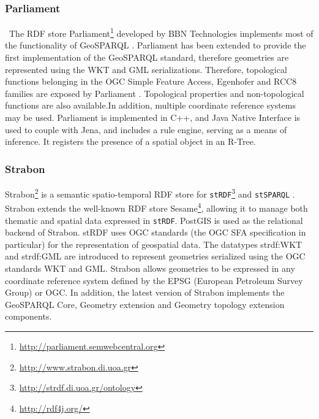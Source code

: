 \subsubsection{Parliament}
\
The RDF store Parliament\footnote{\url{http://parliament.semwebcentral.org}} developed by BBN Technologies implements most of the functionality of GeoSPARQL \cite{battle12}.
Parliament has been extended to provide the first implementation of the GeoSPARQL standard, therefore geometries are represented using the WKT and GML serializations.
Therefore, topological functions belonging in the OGC Simple Feature Access, Egenhofer and RCC8 families are exposed by Parliament \cite{battle12}.
Topological properties and non-topological functions are also available.In addition, multiple coordinate reference systems may be used. Parliament is implemented in C++, and Java Native Interface is used to couple with Jena, and includes a rule engine, serving as a means of inference. It registers the presence of a spatial object in an R-Tree.

\subsubsection{Strabon}
Strabon\footnote{\url{http://www.strabon.di.uoa.gr}} is a semantic spatio-temporal RDF store for \texttt{stRDF}\footnote{\url{http://strdf.di.uoa.gr/ontology}} and \texttt{stSPARQL} \cite{strabon12}. Strabon extends the well-known RDF store Sesame\footnote{\url{http://rdf4j.org/}}, allowing it to manage both thematic and spatial data expressed in \texttt{stRDF}. PostGIS is used as the relational backend of Strabon.
stRDF uses OGC standards (the OGC SFA specification in particular) for the representation of geospatial data.
The datatypes strdf:WKT and strdf:GML are introduced to represent geometries serialized using the OGC standards WKT and GML. Strabon allows geometries to be expressed in any coordinate reference system defined by the EPSG (European Petroleum Survey Group) or OGC. In addition, the latest version of Strabon implements the GeoSPARQL Core, Geometry extension and Geometry topology extension components.



